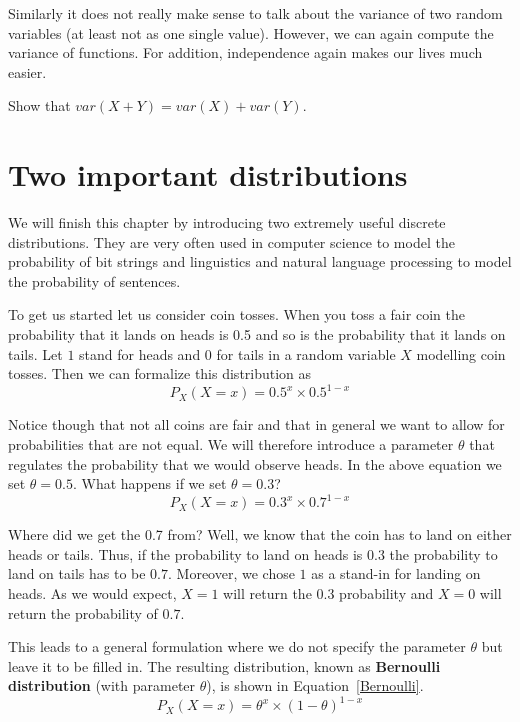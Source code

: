 \documentclass[a4paper,11pt,leqno]{report}
\begin{document}
Similarly it does not really make sense to talk about the variance of two random variables (at least not as one single
value). However, we can again compute the variance of functions. For addition, independence again makes our lives
much easier.

\begin{Exercise}
Show that $ var(X + Y) = var(X) + var(Y) $.
\end{Exercise}



\section{Two important distributions}

We will finish this chapter by introducing two extremely useful discrete distributions. They are very often used in
computer science to model the probability of bit strings and linguistics and natural language processing to model
the probability of sentences. 

To get us started let us consider coin tosses. When you toss a fair coin the probability that it lands on heads is 0.5 and
so is the probability that it lands on tails. Let $ 1 $ stand for heads and $ 0 $ for tails in a random variable $ X $ 
modelling coin tosses. Then we can formalize this distribution as
\begin{equation}
P_{X}(X=x) = 0.5^{x}\times 0.5^{1-x}
\end{equation}

Notice though that not all coins are fair and that in general we want to allow for probabilities that are not equal. 
We will therefore introduce a parameter $ \theta $ that regulates the probability that we would observe heads. In the
above equation we set $ \theta = 0.5 $. What happens if we set $ \theta = 0.3 $?
\begin{equation}
P_{X}(X=x) = 0.3^{x} \times 0.7^{1-x}
\end{equation}

Where did we get the 0.7 from? Well, we know that the coin has to land on either heads or tails. Thus, if the probability
to land on heads is $ 0.3 $ the probability to land on tails has to be $ 0.7 $. Moreover, we chose $ 1 $ as a stand-in for
landing on heads. As we would expect, $ X = 1 $ will return the $ 0.3 $ probability and $ X = 0 $ will return the probability of $ 0.7 $.

This leads to a general formulation where we do not specify the parameter $ \theta $ but leave it to be filled in. 
The resulting distribution, known as \textbf{Bernoulli distribution} (with parameter $ \theta $), is shown in Equation~\eqref{Bernoulli}.
\begin{equation}\label{Bernoulli}
P_{X}(X=x) = \theta^{x} \times (1 - \theta)^{1-x}
\end{equation}
\end{document}
